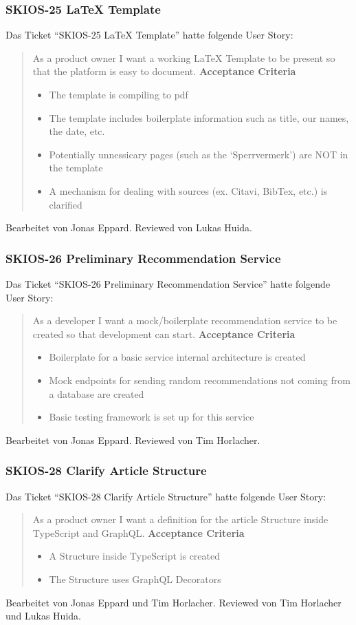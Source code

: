 \subsubsection{SKIOS-25 LaTeX Template}
Das Ticket \enquote{SKIOS-25 LaTeX Template} hatte folgende User Story:
\begin{quotation}
    As a product owner I want a working LaTeX Template to be present so that the platform is easy to document.
\textbf{Acceptance Criteria}
\begin{itemize}
    \item The template is compiling to pdf
    \item The template includes boilerplate information such as title, our names, the date, etc.
    \item Potentially unnessicary pages (such as the \enquote*{Sperrvermerk}) are NOT in the template
    \item A mechanism for dealing with sources (ex. Citavi, BibTex, etc.) is clarified
\end{itemize}
\end{quotation}
Bearbeitet von Jonas Eppard.
Reviewed von Lukas Huida.

\subsubsection{SKIOS-26 Preliminary Recommendation Service}
Das Ticket \enquote{SKIOS-26 Preliminary Recommendation Service} hatte folgende User Story:
\begin{quotation}
    As a developer I want a mock/boilerplate recommendation service to be created so that development can start.
    \textbf{Acceptance Criteria}
    \begin{itemize}
        \item Boilerplate for a basic service internal architecture is created
        \item Mock endpoints for sending random recommendations not coming from a database are created
        \item Basic testing framework is set up for this service
    \end{itemize}
\end{quotation}
Bearbeitet von Jonas Eppard.
Reviewed von Tim Horlacher.

\subsubsection{SKIOS-28 Clarify Article Structure}
Das Ticket \enquote{SKIOS-28 Clarify Article Structure} hatte folgende User Story:
\begin{quotation}
    As a product owner I want a definition for the article Structure inside TypeScript and GraphQL.
\textbf{Acceptance Criteria}
\begin{itemize}
    \item A Structure inside TypeScript is created
    \item The Structure uses GraphQL Decorators
\end{itemize}
\end{quotation}
Bearbeitet von Jonas Eppard und Tim Horlacher.
Reviewed von Tim Horlacher und Lukas Huida.


